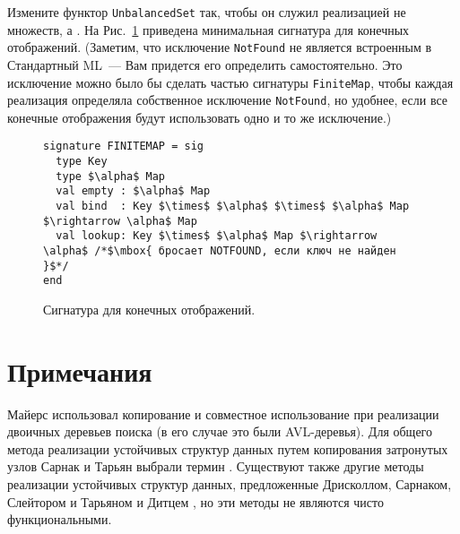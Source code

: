 \begin{exercise}\label{ex:2.6}
  Измените функтор \lstinline!UnbalancedSet! так, чтобы он служил
  реализацией не множеств, а . На
  Рис.~\ref{fig:2.10} приведена минимальная сигнатура для конечных
  отображений. (Заметим, что исключение \lstinline!NotFound! не
  является встроенным в Стандартный ML~--- Вам придется его определить
  самостоятельно. Это исключение можно было бы сделать частью
  сигнатуры \lstinline!FiniteMap!,  чтобы каждая реализация
  определяла собственное исключение \lstinline!NotFound!, но удобнее,
  если все конечные отображения будут использовать одно и то же
  исключение.)
\end{exercise}

\begin{figure}
\begin{lstlisting}
signature FINITEMAP = sig
  type Key
  type $\alpha$ Map
  val empty : $\alpha$ Map
  val bind  : Key $\times$ $\alpha$ $\times$ $\alpha$ Map $\rightarrow \alpha$ Map
  val lookup: Key $\times$ $\alpha$ Map $\rightarrow \alpha$ /*$\mbox{ бросает NOTFOUND, если ключ не найден }$*/
end
\end{lstlisting}
  \caption{Сигнатура для конечных отображений.}
  \label{fig:2.10}
\end{figure}

\section{Примечания}
\label{sc:2.3}

Майерс \cite{Myers1982,Myers1984} использовал копирование и совместное использование
при реализации двоичных деревьев поиска (в его случае это были
AVL-деревья).  Для общего метода реализации устойчивых структур данных
путем копирования затронутых узлов
Сарнак и Тарьян \cite{SarnakTarjan1986a} выбрали термин
. Существуют также другие методы
реализации устойчивых структур данных, предложенные Дрисколлом,
Сарнаком, Слейтором и Тарьяном \cite{Driscoll-etal1989} и Дитцем
\cite{Dietz1989}, но эти методы не являются чисто функциональными.

